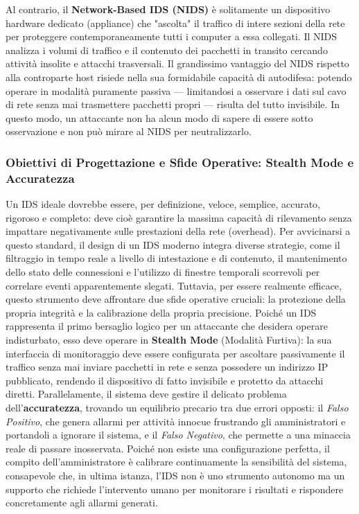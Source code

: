 \documentclass{article}
\begin{document}
Al contrario, il \textbf{Network-Based IDS (NIDS)} è solitamente un dispositivo hardware dedicato (appliance) che "ascolta" il traffico di intere sezioni della rete per proteggere contemporaneamente tutti i computer a essa collegati. Il NIDS analizza i volumi di traffico e il contenuto dei pacchetti in transito cercando attività insolite e attacchi trasversali. Il grandissimo vantaggio del NIDS rispetto alla controparte host risiede nella sua formidabile capacità di autodifesa: potendo operare in modalità puramente passiva --- limitandosi a osservare i dati sul cavo di rete senza mai trasmettere pacchetti propri --- risulta del tutto invisibile. In questo modo, un attaccante non ha alcun modo di sapere di essere sotto osservazione e non può mirare al NIDS per neutralizzarlo.

\subsubsection*{Obiettivi di Progettazione e Sfide Operative: Stealth Mode e Accuratezza}

Un IDS ideale dovrebbe essere, per definizione, veloce, semplice, accurato, rigoroso e completo: deve cioè garantire la massima capacità di rilevamento senza impattare negativamente sulle prestazioni della rete (overhead). Per avvicinarsi a questo standard, il design di un IDS moderno integra diverse strategie, come il filtraggio in tempo reale a livello di intestazione e di contenuto, il mantenimento dello stato delle connessioni e l'utilizzo di finestre temporali scorrevoli per correlare eventi apparentemente slegati. Tuttavia, per essere realmente efficace, questo strumento deve affrontare due sfide operative cruciali: la protezione della propria integrità e la calibrazione della propria precisione. Poiché un IDS rappresenta il primo bersaglio logico per un attaccante che desidera operare indisturbato, esso deve operare in \textbf{Stealth Mode} (Modalità Furtiva): la sua interfaccia di monitoraggio deve essere configurata per ascoltare passivamente il traffico senza mai inviare pacchetti in rete e senza possedere un indirizzo IP pubblicato, rendendo il dispositivo di fatto invisibile e protetto da attacchi diretti. Parallelamente, il sistema deve gestire il delicato problema dell'\textbf{accuratezza}, trovando un equilibrio precario tra due errori opposti: il \textit{Falso Positivo}, che genera allarmi per attività innocue frustrando gli amministratori e portandoli a ignorare il sistema, e il \textit{Falso Negativo}, che permette a una minaccia reale di passare inosservata. Poiché non esiste una configurazione perfetta, il compito dell'amministratore è calibrare continuamente la sensibilità del sistema, consapevole che, in ultima istanza, l'IDS non è uno strumento autonomo ma un supporto che richiede l'intervento umano per monitorare i risultati e rispondere concretamente agli allarmi generati.
\end{document}
